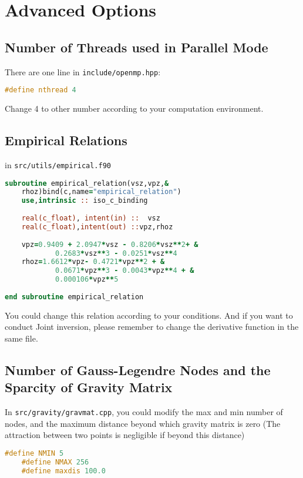 \documentclass[UTF8]{article}
\begin{document}
    \section{Advanced Options}
    \subsection{Number of Threads used in Parallel Mode}\label{number of threads}
    There are one line in \verb!include/openmp.hpp!:
    \begin{lstlisting}[language=c++]
    #define nthread 4
    \end{lstlisting}
    Change 4 to other number according to your computation environment.

    \subsection{Empirical Relations}
    in \verb!src/utils/empirical.f90! 
\begin{lstlisting}[language=fortran]
subroutine empirical_relation(vsz,vpz,&
    rhoz)bind(c,name="empirical_relation")
    use,intrinsic :: iso_c_binding
    
    real(c_float), intent(in) ::  vsz
    real(c_float),intent(out) ::vpz,rhoz
    
    vpz=0.9409 + 2.0947*vsz - 0.8206*vsz**2+ &
            0.2683*vsz**3 - 0.0251*vsz**4
    rhoz=1.6612*vpz- 0.4721*vpz**2 + &
            0.0671*vpz**3 - 0.0043*vpz**4 + & 
            0.000106*vpz**5
    
end subroutine empirical_relation
\end{lstlisting}
    You could change this relation according to your conditions. And if you want to conduct
    Joint inversion, please remember to change the derivative function in the same file.

    \subsection{Number of Gauss-Legendre Nodes and the Sparcity of Gravity Matrix}
    In \verb!src/gravity/gravmat.cpp!, you could modify the max and min number of nodes,
    and the maximum distance beyond which gravity matrix is zero (The attraction between two 
    points is negligible if beyond this distance)
    \begin{lstlisting}[language=c++]
    #define NMIN 5
    #define NMAX 256
    #define maxdis 100.0 
    \end{lstlisting}
\end{document}
